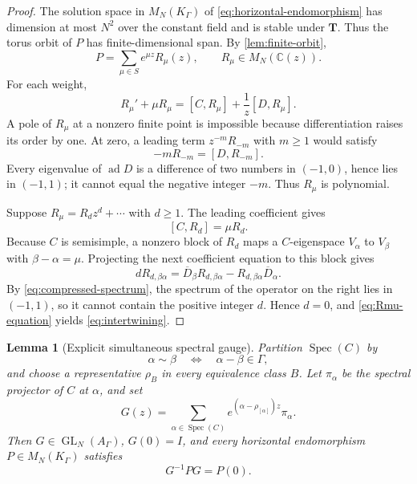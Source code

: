 \documentclass[11pt]{article}
\numberwithin{equation}{section}
\newtheorem{lemma}[lemma]{Lemma}
\theoremstyle{definition}
\theoremstyle{remark}
\newcommand{\C}{\mathbb C}
\newcommand{\Spec}{\operatorname{Spec}}
\begin{document}
\begin{proof}
The solution space in $M_N(K_\Gamma)$ of
\eqref{eq:horizontal-endomorphism} has dimension at most $N^2$ over the
constant field and is stable under $\mathbf T$.  Thus the torus orbit of $P$
has finite-dimensional span.  By \cref{lem:finite-orbit},
\[
  P=\sum_{\mu\in S}e^{\mu z}R_\mu(z),
  \qquad R_\mu\in M_N(\C(z)).
\]
For each weight,
\begin{equation}\label{eq:Rmu-equation}
  R_\mu'+\mu R_\mu
  =[C,R_\mu]+\frac1z[D,R_\mu].
\end{equation}
A pole of $R_\mu$ at a nonzero finite point is impossible because
differentiation raises its order by one.  At zero, a leading term
$z^{-m}R_{-m}$ with $m\ge1$ would satisfy
\[
  -mR_{-m}=[D,R_{-m}].
\]
Every eigenvalue of $\operatorname{ad}D$ is a difference of two numbers in
$(-1,0)$, hence lies in $(-1,1)$; it cannot equal the negative integer
$-m$.  Thus $R_\mu$ is polynomial.

Suppose $R_\mu=R_dz^d+\cdots$ with $d\ge1$.  The leading coefficient gives
\[
  [C,R_d]=\mu R_d.
\]
Because $C$ is semisimple, a nonzero block of $R_d$ maps a
$C$-eigenspace $V_\alpha$ to $V_\beta$ with $\beta-\alpha=\mu$.
Projecting the next coefficient equation to this block gives
\[
  dR_{d,\beta\alpha}
  =\overline D_\beta R_{d,\beta\alpha}
   -R_{d,\beta\alpha}\overline D_\alpha.
\]
By \eqref{eq:compressed-spectrum}, the spectrum of the operator on the
right lies in $(-1,1)$, so it cannot contain the positive integer $d$.
Hence $d=0$, and \eqref{eq:Rmu-equation} yields
\eqref{eq:intertwining}.
\end{proof}

\begin{lemma}[Explicit simultaneous spectral gauge]
\label{lem:spectral-gauge}
Partition $\Spec(C)$ by
\[
  \alpha\sim\beta\quad\Longleftrightarrow\quad\alpha-\beta\in\Gamma,
\]
and choose a representative $\rho_B$ in every equivalence class $B$.
Let $\pi_\alpha$ be the spectral projector of $C$ at $\alpha$, and set
\begin{equation}\label{eq:spectral-gauge}
  G(z)=\sum_{\alpha\in\Spec(C)}
       e^{(\alpha-\rho_{[\alpha]})z}\pi_\alpha.
\end{equation}
Then $G\in\operatorname{GL}_N(A_\Gamma)$, $G(0)=I$, and every horizontal
endomorphism $P\in M_N(K_\Gamma)$ satisfies
\begin{equation}\label{eq:simultaneous-constant}
  G^{-1}PG=P(0).
\end{equation}
\end{lemma}
\end{document}
